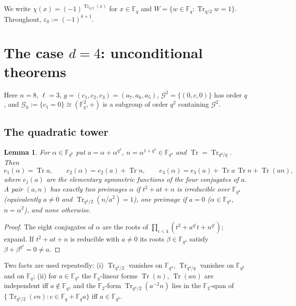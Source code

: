 \documentclass[11pt,a4paper]{amsart}
\newtheorem{lemma}[theorem]{Lemma}
\theoremstyle{definition}
\newcommand{\F}{\mathbb{F}}
\newcommand{\G}{\mathcal{G}}
\newcommand{\Tr}{\operatorname{Tr}}
\newcommand{\sgn}{\varepsilon_0}
\begin{document}
We write $\chi(x)=(-1)^{\Tr_{q/2}(x)}$ for $x\in\F_q$ and $W=\{w\in\F_q:\Tr_{q/2}w=1\}$. Throughout, $\sgn:=(-1)^{k+1}$.

\section{The case \texorpdfstring{$d=4$}{d=4}: unconditional theorems}\label{sec:d4}

Here $n=8$, $\ell=3$, $g=(c_1,c_2,c_3)=(a_7,a_6,a_5)$, $\G^2=\{(0,c,0)\}$ has order $q$, and $\G_0:=\{c_1=0\}\cong(\F_q^2,+)$ is a subgroup of order $q^2$ containing $\G^2$.

\subsection{The quadratic tower}
\begin{lemma}\label{lem:towerA}
For $\alpha\in\F_{q^8}$ put $a=\alpha+\alpha^{q^4}$, $n=\alpha^{1+q^4}\in\F_{q^4}$ and $\Tr=\Tr_{q^4/q}$. Then
\[
e_1(\alpha)=\Tr a,\qquad e_2(\alpha)=e_2(a)+\Tr n,\qquad e_3(\alpha)=e_3(a)+\Tr a\,\Tr n+\Tr(an),
\]
where $e_j(a)$ are the elementary symmetric functions of the four conjugates of $a$. A pair $(a,n)$ has exactly two preimages $\alpha$ if $t^2+at+n$ is irreducible over $\F_{q^4}$ (equivalently $a\ne0$ and $\Tr_{q^4/2}(n/a^2)=1$), one preimage if $a=0$ ($\alpha\in\F_{q^4}$, $n=\alpha^2$), and none otherwise.
\end{lemma}
\begin{proof}
The eight conjugates of $\alpha$ are the roots of $\prod_{i<4}(t^2+a^{q^i}t+n^{q^i})$; expand. If $t^2+at+n$ is reducible with $a\ne0$ its roots $\beta\in\F_{q^4}$ satisfy $\beta+\beta^{q^4}=0\ne a$.
\end{proof}

Two facts are used repeatedly: (i) $\Tr_{q^8/2}$ vanishes on $\F_{q^4}$, $\Tr_{q^4/q}$ vanishes on $\F_{q^2}$ and on $\F_q$; (ii) for $a\in\F_{q^4}$ the $\F_q$-linear forms $\Tr(n)$, $\Tr(an)$ are independent iff $a\notin\F_q$, and the $\F_2$-form $\Tr_{q^4/2}(a^{-2}n)$ lies in the $\F_2$-span of $\{\Tr_{q^4/2}(cn):c\in\F_q+\F_qa\}$ iff $a\in\F_{q^2}$.
\end{document}
